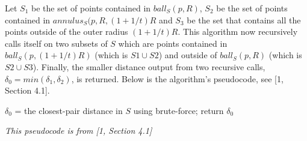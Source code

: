 \documentclass[12pt,english,]{article}
\let\origfigure\figure
\let\endorigfigure\endfigure
\renewenvironment{figure}[1][2] {
    \expandafter\origfigure\expandafter[H]
} {
    \endorigfigure
}
\begin{document}
Let \(S_1\) be the set of points contained in \(ball_S(p, R)\), \(S_2\)
be the set of points contained in \(annulus_S(p, R, (1+1/t)R\) and
\(S_3\) be the set that contains all the points outside of the outer
radius \((1+1/t)R\). This algorithm now recursively calls itself on two
subsets of \(S\) which are points contained in \(ball_S(p,(1+1/t)R)\)
(which is \(S1 \cup S2\)) and outside of \(ball_S(p, R)\) (which is
\(S2 \cup S3\)). Finally, the smaller distance output from two recursive
calls, \(\delta_0 = min(\delta_1, \delta_2)\), is returned. Below is the
algorithm's pseudocode, see {[}1, Section 4.1{]}.

\begin{figure}[ht]
    \centering
    \begin{minipage}{1\linewidth}
      {\LinesNotNumbered
      \begin{algorithm}[H]
      \SetAlgoLined
      \BlankLine

      \centering
      \begin{minipage}{.86\linewidth}
       {
        $\delta_0$ = the closest-pair distance in $S$ using brute-force;
      }
      return $\delta_0$ 
      \end{minipage}
      \caption{\textsc{ClosestPair}$(S,n,d)$}
      \end{algorithm}}
    \end{minipage}
    \begin{minipage}{1\textwidth}
      \begin{flushright}
      {\footnotesize \emph{This pseudocode is from [1, Section 4.1]}\par}
      \end{flushright}
    \end{minipage}

\end{figure}
\end{document}
